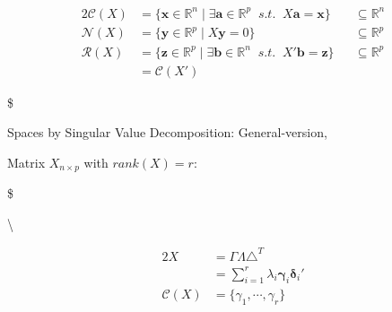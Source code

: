 \documentclass[
]{book}
\begin{document}
{{{\begin{alignat}{2}
\mathcal{C}(X)

&=



\{ \pmb x \in \mathbb{R}^n  \; \vert \; \exists \pmb a \in \mathbb{R}^p \; \; s.t. \; \; X \pmb a = \pmb x\}  

&&\subseteq 
\mathbb{R}^n

\tag{column (range) space}

\\


\mathcal{N}(X)

&=

\{ \pmb y \in \mathbb{R}^p  \; \vert \; X \pmb y = 0 \}  &&\subseteq \mathbb{R}^p

\tag{null space}


\\


\mathcal{R}(X)



&= 

\{ \pmb z \in \mathbb{R}^p  \; \vert \; \exists \pmb b \in \mathbb{R}^n \; \; s.t. \; \; X' \pmb b = \pmb z \}


&&\subseteq 
\mathbb{R}^p

\tag{row space}


\\

&= \mathcal{C}(X')


\tag{column space of X`}


\end{alignat}

\$

Spaces by Singular Value Decomposition: General-version,

Matrix \(X_{n \times p}\) with \(rank(X)=r\):

\$

\textbackslash{}

\begin{alignat}{2}

X &= \Gamma \Lambda \triangle^T 

\\

& =\sum_{i=1}^r \lambda_i \pmb \gamma_i \pmb \delta_i '

\\

\mathcal{C}(X)

&= \{ \gamma_1 , \cdots, \gamma_r \}



\\




\end{alignat}}}}
\end{document}
